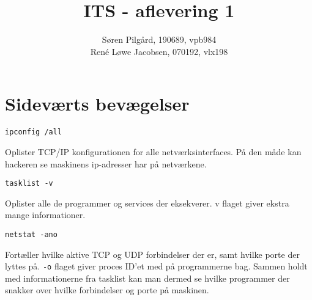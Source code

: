 \documentclass[10pt,a4paper,danish]{article}
\title{ITS - aflevering 1}
\author{Søren Pilgård, 190689, vpb984\\
René Løwe Jacobsen, 070192, vlx198}
\begin{document}
\maketitle
\newpage

\tableofcontents
\newpage

\section{}






\section{}

\section{Sideværts bevægelser}

\begin{verbatim}
ipconfig /all
\end{verbatim}
Oplister TCP/IP konfigurationen for alle netværksinterfaces.
På den måde kan hackeren se maskinens ip-adresser har på netværkene.

\begin{verbatim}
tasklist -v
\end{verbatim}
Oplister alle de programmer og services der eksekverer. v flaget giver ekstra
mange informationer.

\begin{verbatim}
netstat -ano
\end{verbatim}
Fortæller hvilke aktive TCP og UDP forbindelser der er, samt hvilke porte der
lyttes på. \texttt{-o} flaget giver proces ID'et med på programmerne bag.
Sammen holdt med informationerne fra tasklist kan man dermed se hvilke
programmer der snakker over hvilke forbindelser og porte på maskinen.
\end{document}

